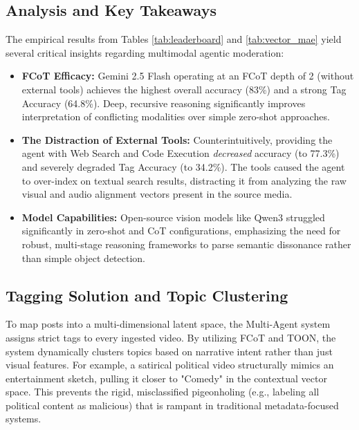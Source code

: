 \documentclass[12pt,letterpaper]{article}
\begin{document}
\subsection{Analysis and Key Takeaways}
The empirical results from Tables \ref{tab:leaderboard} and \ref{tab:vector_mae} yield several critical insights regarding multimodal agentic moderation:
\begin{itemize}
    \item \textbf{FCoT Efficacy:} Gemini 2.5 Flash operating at an FCoT depth of 2 (without external tools) achieves the highest overall accuracy (83\%) and a strong Tag Accuracy (64.8\%). Deep, recursive reasoning significantly improves interpretation of conflicting modalities over simple zero-shot approaches.
    \item \textbf{The Distraction of External Tools:} Counterintuitively, providing the agent with Web Search and Code Execution \textit{decreased} accuracy (to 77.3\%) and severely degraded Tag Accuracy (to 34.2\%). The tools caused the agent to over-index on textual search results, distracting it from analyzing the raw visual and audio alignment vectors present in the source media.
    \item \textbf{Model Capabilities:} Open-source vision models like Qwen3 struggled significantly in zero-shot and CoT configurations, emphasizing the need for robust, multi-stage reasoning frameworks to parse semantic dissonance rather than simple object detection.
\end{itemize}

\subsection{Tagging Solution and Topic Clustering}
To map posts into a multi-dimensional latent space, the Multi-Agent system assigns strict tags to every ingested video. By utilizing FCoT and TOON, the system dynamically clusters topics based on narrative intent rather than just visual features. For example, a satirical political video structurally mimics an entertainment sketch, pulling it closer to "Comedy" in the contextual vector space. This prevents the rigid, misclassified pigeonholing (e.g., labeling all political content as malicious) that is rampant in traditional metadata-focused systems.
\end{document}
